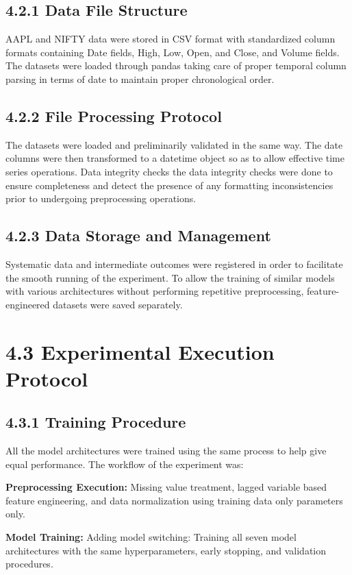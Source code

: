\documentclass[12pt,a4paper]{report}
\begin{document}
\subsection{4.2.1 Data File Structure}
AAPL and NIFTY data were stored in CSV format with standardized column formats containing Date fields, High, Low, Open, and Close, and Volume fields. The datasets were loaded through pandas taking care of proper temporal column parsing in terms of date to maintain proper chronological order.

\subsection{4.2.2 File Processing Protocol}
The datasets were loaded and preliminarily validated in the same way. The date columns were then transformed to a datetime object so as to allow effective time series operations. Data integrity checks the data integrity checks were done to ensure completeness and detect the presence of any formatting inconsistencies prior to undergoing preprocessing operations.

\subsection{4.2.3 Data Storage and Management}
Systematic data and intermediate outcomes were registered in order to facilitate the smooth running of the experiment. To allow the training of similar models with various architectures without performing repetitive preprocessing, feature-engineered datasets were saved separately.

\section{4.3 Experimental Execution Protocol}
\subsection{4.3.1 Training Procedure}
All the model architectures were trained using the same process to help give equal performance. The workflow of the experiment was:

\textbf{Preprocessing Execution:} Missing value treatment, lagged variable based feature engineering, and data normalization using training data only parameters only.

\textbf{Model Training:} Adding model switching: Training all seven model architectures with the same hyperparameters, early stopping, and validation procedures.
\end{document}
